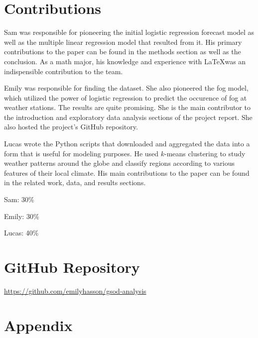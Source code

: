 \documentclass[conference]{IEEEtran}
\begin{document}
\section{Contributions}

Sam was responsible for pioneering the initial logistic regression forecast model as well as the multiple linear regression model that resulted from it. His primary contributions to the paper can be found in the methods section as well as the conclusion. As a math major, his knowledge and experience with \LaTeX was an indispensible contribution to the team.

Emily was responsible for finding the dataset. She also pioneered the fog model, which utilized the power of logistic regression to predict the occurence of fog at weather stations. The results are quite promising. She is the main contributor to the introduction and exploratory data analysis sections of the project report. She also hosted the project's GitHub repository.

Lucas wrote the Python scripts that downloaded and aggregated the data into a form that is useful for modeling purposes. He used $k$-means clustering to study weather patterns around the globe and classify regions according to various features of their local climate. His main contributions to the paper can be found in the related work, data, and results sections.

Sam: 30\%

Emily: 30\%

Lucas: 40\%

\section{GitHub Repository}

\href{https://github.com/emilyhasson/gsod-analysis}{https://github.com/emilyhasson/gsod-analysis}

\section{Appendix}
\end{document}
